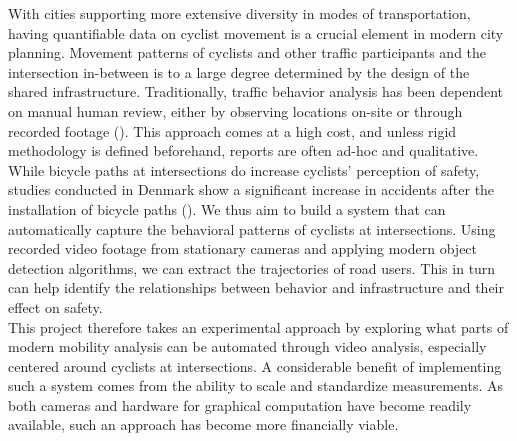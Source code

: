 With cities supporting more extensive diversity in modes of transportation,
having quantifiable data on cyclist movement is a crucial element in modern city planning. 
Movement patterns of cyclists and other traffic participants and the intersection in-between 
is to a large degree determined by the design of the shared infrastructure. 
Traditionally, traffic behavior analysis has been dependent on manual human review, either by observing locations on-site or through recorded footage (\cite{time_consuming}). 
This approach comes at a high cost, and unless rigid methodology is defined beforehand, reports are often ad-hoc and qualitative. 
\ \\

While bicycle paths at intersections do increase cyclists' perception of safety, 
studies conducted in Denmark show a significant increase in accidents after the installation of bicycle paths (\cite{intersection_safety}).
We thus aim to build a system that can automatically capture the behavioral patterns of cyclists at intersections.
Using recorded video footage from stationary cameras and applying modern object detection algorithms, 
we can extract the trajectories of road users. 
This in turn can help identify the relationships between behavior and infrastructure and their effect on safety. 
\ \\

This project therefore takes an experimental approach by exploring what parts of modern mobility analysis can be automated
through video analysis, especially centered around cyclists at intersections.
A considerable benefit of implementing such a system comes from the ability to scale and standardize measurements.
As both cameras and hardware for graphical computation have become readily available, such an approach has become more financially viable.
